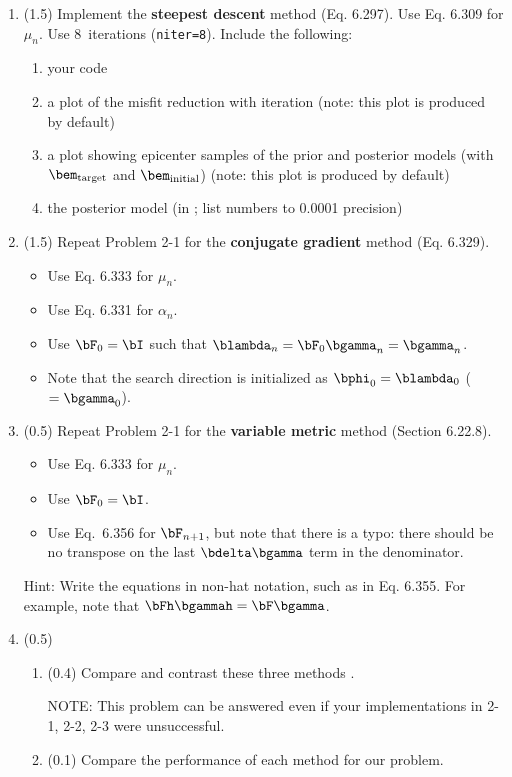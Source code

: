 \documentclass[11pt,titlepage,fleqn]{article}
\begin{document}
\begin{enumerate}
\item (1.5) Implement the {\bf steepest descent} method (Eq. 6.297). Use Eq. 6.309 for $\mu_n$. Use 8~iterations (\verb+niter=8+). Include the following:
%
\begin{enumerate}
\item your code
\item a plot of the misfit reduction with iteration (note: this plot is produced by default)
\item a plot showing epicenter samples of the prior and posterior models (with $\bem_{\rm target}$ and $\bem_{\rm initial}$) (note: this plot is produced by default)
\item the posterior model (in ; list numbers to 0.0001 precision)
\end{enumerate}

\label{steep}

\item (1.5) Repeat Problem 2-1 for the {\bf conjugate gradient} method (Eq. 6.329).
%
\begin{itemize}
\item Use Eq. 6.333 for $\mu_n$.
\item Use Eq. 6.331 for $\alpha_n$.
\item Use $\bF_0 = \bI$ such that $\blambda_n = \bF_0\bgamma_n = \bgamma_n$. 
\item Note that the search direction is initialized as $\bphi_0 = \blambda_0$ ($= \bgamma_0$).
\end{itemize}

\item (0.5) Repeat Problem 2-1 for the {\bf variable metric} method (Section 6.22.8).
%
\begin{itemize}
\item Use Eq. 6.333 for $\mu_n$.
\item Use $\bF_0 = \bI$.
\item Use Eq.~6.356 for $\bF_{n+1}$, but note that there is a typo: there should be no transpose on the last $\bdelta\bgamma$ term in the denominator.
\end{itemize}
%
Hint: Write the equations in non-hat notation, such as in Eq. 6.355. For example, note that $\bFh\bgammah = \bF\bgamma$.

\item (0.5)
%
\begin{enumerate}
\item (0.4) Compare and contrast these three methods \citep[see][]{Tarantola2005}.

NOTE: This problem can be answered even if your implementations in 2-1, 2-2, 2-3 were unsuccessful.

\item (0.1) Compare the performance of each method for our problem.
\end{enumerate}

\end{enumerate}
\end{document}

